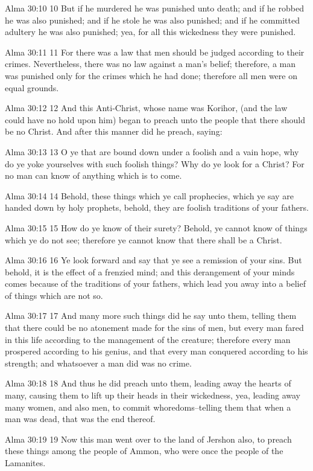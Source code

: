 Alma 30:10
 10 But if he murdered he was punished unto death; and if he
robbed he was also punished; and if he stole he was also
punished; and if he committed adultery he was also punished; yea,
for all this wickedness they were punished.

Alma 30:11
 11 For there was a law that men should be judged according to
their crimes. Nevertheless, there was no law against a man's
belief; therefore, a man was punished only for the crimes which
he had done; therefore all men were on equal grounds.

Alma 30:12
 12 And this Anti-Christ, whose name was Korihor, (and the law
could have no hold upon him) began to preach unto the people that
there should be no Christ. And after this manner did he preach,
saying:

Alma 30:13
 13 O ye that are bound down under a foolish and a vain hope, why
do ye yoke yourselves with such foolish things? Why do ye look
for a Christ? For no man can know of anything which is to come.

Alma 30:14
 14 Behold, these things which ye call prophecies, which ye say
are handed down by holy prophets, behold, they are foolish
traditions of your fathers.

Alma 30:15
 15 How do ye know of their surety? Behold, ye cannot know of
things which ye do not see; therefore ye cannot know that there
shall be a Christ.

Alma 30:16
 16 Ye look forward and say that ye see a remission of your sins.
But behold, it is the effect of a frenzied mind; and this
derangement of your minds comes because of the traditions of your
fathers, which lead you away into a belief of things which are
not so.

Alma 30:17
 17 And many more such things did he say unto them, telling them
that there could be no atonement made for the sins of men, but
every man fared in this life according to the management of the
creature; therefore every man prospered according to his genius,
and that every man conquered according to his strength; and
whatsoever a man did was no crime.

Alma 30:18
 18 And thus he did preach unto them, leading away the hearts of
many, causing them to lift up their heads in their wickedness,
yea, leading away many women, and also men, to commit
whoredoms--telling them that when a man was dead, that was the
end thereof.

Alma 30:19
 19 Now this man went over to the land of Jershon also, to preach
these things among the people of Ammon, who were once the people
of the Lamanites.

